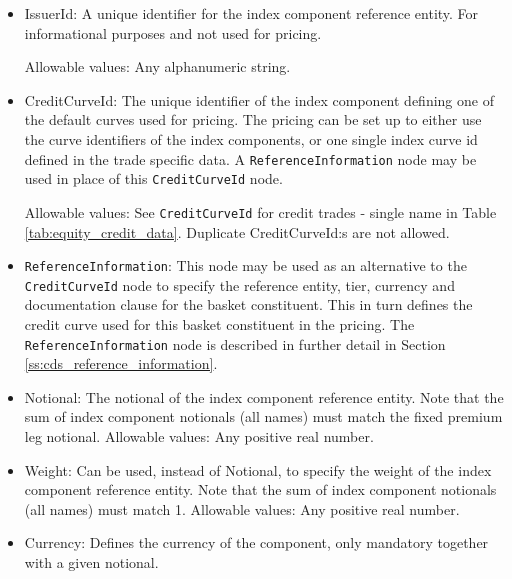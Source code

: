 \begin{itemize}
\item IssuerId: A unique identifier for the index component reference entity. For informational purposes and not used for pricing.

Allowable values:  Any alphanumeric string.



\item CreditCurveId:  The unique identifier of the index component defining one of the default curves used for pricing. The pricing can be set up to either use the curve identifiers of the index components, or one single index curve id defined in the trade specific data. A \lstinline!ReferenceInformation! node may be used in place of this \lstinline!CreditCurveId! node.

Allowable values:  See \lstinline!CreditCurveId! for credit trades - single name in Table \ref{tab:equity_credit_data}. Duplicate CreditCurveId:s are not allowed. \\

\item \lstinline!ReferenceInformation!: This node may be used as an alternative to the \lstinline!CreditCurveId! node to specify the reference entity, tier, currency and documentation clause for the basket constituent. This in turn defines the credit curve used for this basket constituent in the pricing. The \lstinline!ReferenceInformation! node is described in further detail in Section \ref{ss:cds_reference_information}.

\item Notional: The notional of the index component reference entity. Note that the sum of index component notionals (all names) must match the fixed premium leg notional.  Allowable values:  Any positive real number.

\item Weight: Can be used, instead of Notional, to specify the weight of the index component reference entity. Note that the sum of index component notionals (all names) must match 1.  Allowable values:  Any positive real number.

\item Currency: Defines the currency of the component, only mandatory together with a given notional.

\end{itemize}
